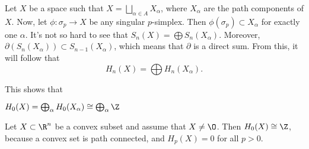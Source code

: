 Let $X$ be a space such that $X = \bigsqcup_{\alpha \in A} X_\alpha$, where $X_\alpha$ are the path components of $X$.
Now, let $\phi: \sigma_p \to  X$ be any singular $p$-simplex.
Then $\phi(\sigma_p) \subset X_\alpha$ for exactly one $\alpha$.
It's not so hard to see that $S_n(X) = \bigoplus S_n(X_\alpha)$.
Moreover,  $\partial(S_n(X_\alpha)) \subset S_{n-1}(X_\alpha)$,
which means that $\partial$ is a direct sum.
From this, it will follow that
\[
    H_n(X) = \bigoplus H_n(X_\alpha)
.\]

This shows that
\begin{prop}
    $H_0(X) = \bigoplus_\alpha H_0(X_\alpha) \cong \bigoplus_\alpha \Z$
\end{prop}

\begin{theorem}
    Let $X \subset \R^n$ be a convex subset and assume that $X \neq \O$.
    Then $H_0(X) \cong \Z$, because a convex set is path connected,
    and $H_p(X) = 0$ for all $p > 0$.
\end{theorem}
